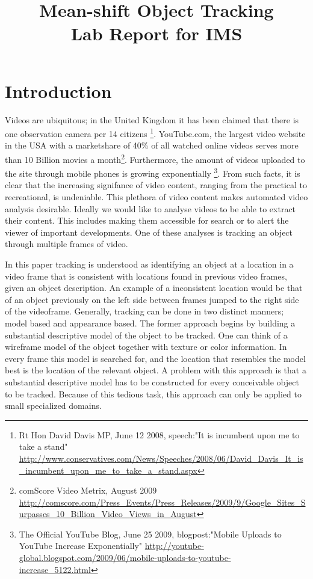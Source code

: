 \documentclass[a4paper,11pt]{article}
\title{Mean-shift Object Tracking\\ Lab Report for IMS}
\date{}
\begin{document}
\maketitle 

\section{Introduction}
	Videos are ubiquitous; in the United Kingdom it has been claimed that there is one observation camera per 14 citizens \footnote{
Rt Hon David Davis MP, June 12 2008, speech:"It is incumbent upon me to take a stand" 
\url{http://www.conservatives.com/News/Speeches/2008/06/David_Davis_It_is_incumbent_upon_me_to_take_a_stand.aspx}
}. YouTube.com, the largest video website in the USA with a marketshare of 40\% of all watched online videos serves more than 10 Billion movies a month\footnote{comScore Video Metrix, August 2009 
\url{http://comscore.com/Press_Events/Press_Releases/2009/9/Google_Sites_Surpasses_10_Billion_Video_Views_in_August}}.
	Furthermore, the amount of videos uploaded to the site through mobile phones is growing exponentially \footnote{The Official YouTube Blog, June 25 2009, blogpost:"Mobile Uploads to YouTube Increase Exponentially" 
\url{http://youtube-global.blogspot.com/2009/06/mobile-uploads-to-youtube-increase_5122.html}}. 
	From such facts, it is clear that the increasing signifance of video content, ranging from the practical to recreational, is undeniable. This plethora of video content makes automated video analysis desirable. Ideally we would like to analyse videos to be able to extract their content. This includes making them accessible for search or to alert the viewer of important developments. One of these analyses is tracking an object through multiple frames of video.

In this paper tracking is understood as identifying an object at a location in a video frame that is consistent with locations found in previous video frames, given an object description. An example of a inconsistent location would be that of an object previously on the left side between frames jumped to the right side of the videoframe. Generally, tracking can be done in two distinct manners; model based and appearance based. 
The former approach begins by building a substantial descriptive model of the object to be tracked. One can think of a wireframe model of the object together with texture or color information. In every frame this model is searched for, and the location that resembles the model best is the location of the relevant object.  A problem with this approach is that a substantial descriptive model has to be constructed for every conceivable object to be tracked.  Because of this tedious task, this approach can only be applied to small specialized domains.  
\end{document}
